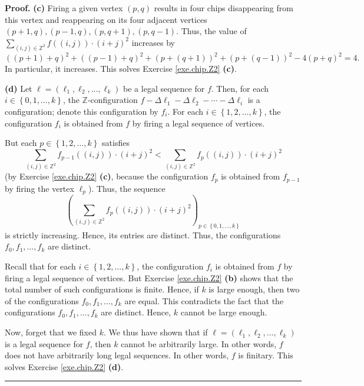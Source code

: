 \documentclass[numbers=enddot,12pt,final,onecolumn,notitlepage]{scrartcl}%
\theoremstyle{definition}
\newenvironment{proof}[1][Proof]{\noindent\textbf{#1.} }{\ \rule{0.5em}{0.5em}}
\let\sumnonlimits\sum
\renewcommand{\sum}{\sumnonlimits\limits}
\begin{document}
\begin{proof}
\textbf{(c)} Firing a given vertex $\left(  p,q\right)  $ results in four
chips disappearing from this vertex and reappearing on its four adjacent
vertices $\left(  p+1,q\right)  ,\left(  p-1,q\right)  ,\left(  p,q+1\right)
,\left(  p,q-1\right)  $. Thus, the value of $\sum_{\left(  i,j\right)
\in\mathbb{Z}^{2}}f\left(  \left(  i,j\right)  \right)  \cdot\left(
i+j\right)  ^{2}$ increases by%
\[
\left(  \left(  p+1\right)  +q\right)  ^{2}+\left(  \left(  p-1\right)
+q\right)  ^{2}+\left(  p+\left(  q+1\right)  \right)  ^{2}+\left(  p+\left(
q-1\right)  \right)  ^{2}-4\left(  p+q\right)  ^{2}=4.
\]
In particular, it increases. This solves Exercise \ref{exe.chip.Z2}
\textbf{(c)}.

\textbf{(d)} Let $\ell=\left(  \ell_{1},\ell_{2},\ldots,\ell_{k}\right)  $ be
a legal sequence for $f$. Then, for each $i\in\left\{  0,1,\ldots,k\right\}
$, the $\mathbb{Z}$-configuration $f-\Delta\ell_{1}-\Delta\ell_{2}%
-\cdots-\Delta\ell_{i}$ is a configuration; denote this configuration by
$f_{i}$. For each $i\in\left\{  1,2,\ldots,k\right\}  $, the configuration
$f_{i}$ is obtained from $f$ by firing a legal sequence of vertices.

But each $p\in\left\{  1,2,\ldots,k\right\}  $ satisfies
\[
\sum_{\left(  i,j\right)  \in\mathbb{Z}^{2}}f_{p-1}\left(  \left(  i,j\right)
\right)  \cdot\left(  i+j\right)  ^{2}<\sum_{\left(  i,j\right)  \in
\mathbb{Z}^{2}}f_{p}\left(  \left(  i,j\right)  \right)  \cdot\left(
i+j\right)  ^{2}%
\]
(by Exercise \ref{exe.chip.Z2} \textbf{(c)}, because the configuration $f_{p}$
is obtained from $f_{p-1}$ by firing the vertex $\ell_{p}$). Thus, the
sequence%
\[
\left(  \sum_{\left(  i,j\right)  \in\mathbb{Z}^{2}}f_{p}\left(  \left(
i,j\right)  \right)  \cdot\left(  i+j\right)  ^{2}\right)  _{p\in\left\{
0,1,\ldots,k\right\}  }%
\]
is strictly increasing. Hence, its entries are distinct. Thus, the
configurations $f_{0},f_{1},\ldots,f_{k}$ are distinct.

Recall that for each $i\in\left\{  1,2,\ldots,k\right\}  $, the configuration
$f_{i}$ is obtained from $f$ by firing a legal sequence of vertices. But
Exercise \ref{exe.chip.Z2} \textbf{(b)} shows that the total number of such
configurations is finite. Hence, if $k$ is large enough, then two of the
configurations $f_{0},f_{1},\ldots,f_{k}$ are equal. This contradicts the fact
that the configurations $f_{0},f_{1},\ldots,f_{k}$ are distinct. Hence, $k$
cannot be large enough.

Now, forget that we fixed $k$. We thus have shown that if $\ell=\left(
\ell_{1},\ell_{2},\ldots,\ell_{k}\right)  $ is a legal sequence for $f$, then
$k$ cannot be arbitrarily large. In other words, $f$ does not have arbitrarily
long legal sequences. In other words, $f$ is finitary. This solves Exercise
\ref{exe.chip.Z2} \textbf{(d)}.
\end{proof}
\end{document}
